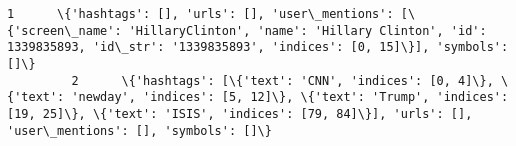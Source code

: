 \documentclass[11pt]{article}
\begin{document}
\begin{Verbatim}[commandchars=\\\{\}]
         1      \{'hashtags': [], 'urls': [], 'user\_mentions': [\{'screen\_name': 'HillaryClinton', 'name': 'Hillary Clinton', 'id': 1339835893, 'id\_str': '1339835893', 'indices': [0, 15]\}], 'symbols': []\}                                                                                                                                                                                                                                                                                                                                                                                                                                                                                                                                                                                                                                                                                                                                                                                                                                                                                                                                                                                                                     
         2      \{'hashtags': [\{'text': 'CNN', 'indices': [0, 4]\}, \{'text': 'newday', 'indices': [5, 12]\}, \{'text': 'Trump', 'indices': [19, 25]\}, \{'text': 'ISIS', 'indices': [79, 84]\}], 'urls': [], 'user\_mentions': [], 'symbols': []\}                                                                                                                                                                                                                                                                                                                                                                                                                                                                                                                                                                                                                                                                                                                                                                                                                                                                                                                                                                                      

\end{Verbatim}
\end{document}
